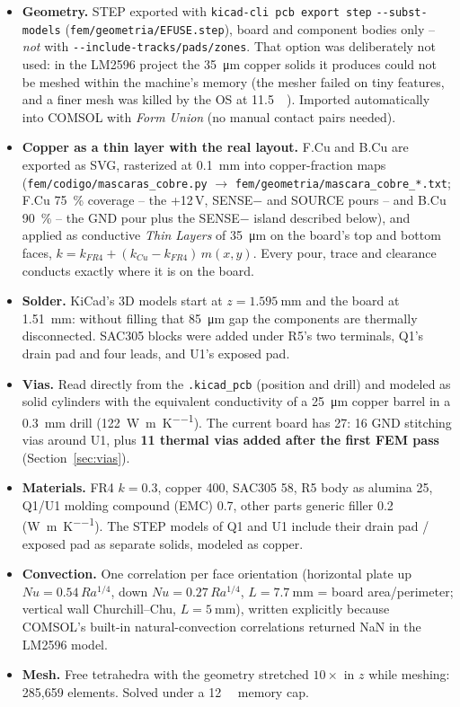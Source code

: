 \documentclass[11pt,letterpaper]{article}
\begin{document}
\begin{itemize}[nosep]
\item \textbf{Geometry.} STEP exported with \texttt{kicad-cli pcb export step} \nolinkurl{--subst-models}
(\nolinkurl{fem/geometria/EFUSE.step}), board and component bodies only -- \emph{not} with
\nolinkurl{--include-tracks/pads/zones}. That option was deliberately not used: in the LM2596 project the
\SI{35}{\micro\meter} copper solids it produces could not be meshed within the machine's memory (the
mesher failed on tiny features, and a finer mesh was killed by the OS at \SI{11.5}{\giga\byte}).
Imported automatically into COMSOL with \textit{Form Union} (no manual contact pairs needed).
\item \textbf{Copper as a thin layer with the real layout.} F.Cu and B.Cu are exported as SVG,
rasterized at \SI{0.1}{\milli\meter} into copper-fraction maps (\nolinkurl{fem/codigo/mascaras_cobre.py}
$\to$ \nolinkurl{fem/geometria/mascara_cobre_*.txt}; F.Cu \SI{75}{\percent} coverage -- the +12\,V, SENSE$-$
and SOURCE pours -- and B.Cu \SI{90}{\percent} -- the GND pour plus the SENSE$-$ island described below),
and applied as conductive \textit{Thin Layers} of \SI{35}{\micro\meter} on the board's top and bottom
faces, $k=k_{FR4}+(k_{Cu}-k_{FR4})\,m(x,y)$. Every pour, trace and clearance conducts exactly where it is on
the board.
\item \textbf{Solder.} KiCad's 3D models start at $z=\SI{1.595}{\milli\meter}$ and the board at
\SI{1.51}{\milli\meter}: without filling that \SI{85}{\micro\meter} gap the components are thermally
disconnected. SAC305 blocks were added under R5's two terminals, Q1's drain pad and four leads, and U1's
exposed pad.
\item \textbf{Vias.} Read directly from the \texttt{.kicad\_pcb} (position and drill) and modeled as solid
cylinders with the equivalent conductivity of a \SI{25}{\micro\meter} copper barrel in a
\SI{0.3}{\milli\meter} drill (\SI{122}{\watt\per\meter\per\kelvin}). The current board has 27: 16 GND
stitching vias around U1, plus \textbf{11 thermal vias added after the first FEM pass} (Section~\ref{sec:vias}).
\item \textbf{Materials.} FR4 $k=0.3$, copper 400, SAC305 58, R5 body as alumina 25, Q1/U1 molding
compound (EMC) 0.7, other parts generic filler 0.2 (\si{\watt\per\meter\per\kelvin}). The STEP models
of Q1 and U1 include their drain pad / exposed pad as separate solids, modeled as copper.
\item \textbf{Convection.} One correlation per face orientation (horizontal plate up $Nu=0.54\,Ra^{1/4}$,
down $Nu=0.27\,Ra^{1/4}$, $L=\SI{7.7}{\milli\meter}$ = board area/perimeter; vertical wall
Churchill--Chu, $L=\SI{5}{\milli\meter}$), written explicitly because COMSOL's built-in natural-convection
correlations returned NaN in the LM2596 model.
\item \textbf{Mesh.} Free tetrahedra with the geometry stretched $10\times$ in $z$ while meshing:
285,659 elements. Solved under a \SI{12}{\giga\byte} memory cap.
\end{itemize}
\end{document}
